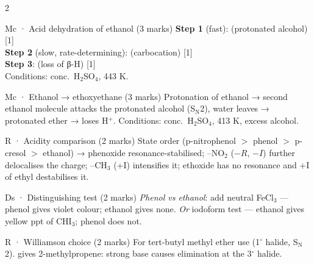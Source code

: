 \documentclass[10pt,a4paper]{extarticle}
\newcommand{\mk}[1]{{\scriptsize\color{black!55}[#1]}}
\begin{document}
\begin{multicols}{2}
\begin{skel}{Mc · Acid dehydration of ethanol (3 marks)}
\textbf{Step 1} (fast):  (protonated alcohol) \mk{1}\\
\textbf{Step 2} (slow, rate-determining):  (carbocation) \mk{1}\\
\textbf{Step 3}:  (loss of β-H) \mk{1}\\
Conditions: conc.\ H$_2$SO$_4$, 443 K.
\end{skel}
\begin{skel}{Mc · Ethanol → ethoxyethane (3 marks)}
Protonation of ethanol → second ethanol molecule attacks the protonated alcohol (S$_\text{N}$2), water leaves → protonated ether → loses H$^+$. Conditions: conc.\ H$_2$SO$_4$, 413 K, excess alcohol.
\end{skel}
\begin{skel}{R · Acidity comparison (2 marks)}
State order (p-nitrophenol $>$ phenol $>$ p-cresol $>$ ethanol) → phenoxide resonance-stabilised; --NO$_2$ ($-R$, $-I$) further delocalises the charge; --CH$_3$ (+I) intensifies it; ethoxide has no resonance and +I of ethyl destabilises it.
\end{skel}
\begin{skel}{Ds · Distinguishing test (2 marks)}
\textit{Phenol vs ethanol}: add neutral FeCl$_3$ — phenol gives violet colour; ethanol gives none. \textit{Or} iodoform test — ethanol gives yellow ppt of CHI$_3$; phenol does not.
\end{skel}
\begin{skel}{R · Williamson choice (2 marks)}
For tert-butyl methyl ether use  (1$^\circ$ halide, S$_\text{N}$2).  gives 2-methylpropene: strong base causes elimination at the 3$^\circ$ halide.
\end{skel}


\end{multicols}
\end{document}
